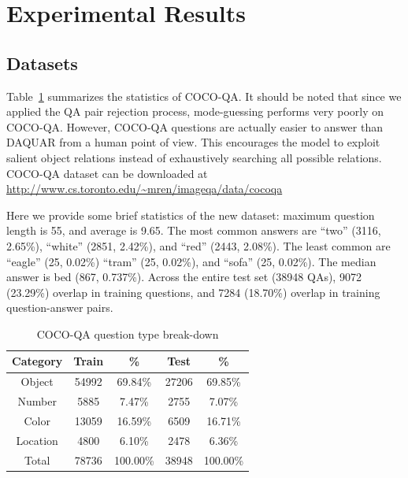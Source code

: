 \documentclass{article} %
\renewcommand{\#}[1]{\textbf{#1}}
\begin{document}
\section{Experimental Results}

\subsection{Datasets}

Table~\ref{tab:dataset_category_stats} summarizes the statistics of COCO-QA. It
should be noted that since we applied the QA pair rejection process,
mode-guessing performs very poorly on COCO-QA. However, COCO-QA questions are
actually easier to answer than DAQUAR from a human point of view. This
encourages the model to exploit salient object relations instead of
exhaustively searching all possible relations. COCO-QA dataset can be
downloaded at \url{http://www.cs.toronto.edu/~mren/imageqa/data/cocoqa}

Here we provide some brief statistics of the new dataset: maximum question
length is 55, and average is 9.65.  The most common answers are ``two'' (3116,
2.65\%), ``white'' (2851, 2.42\%), and ``red'' (2443, 2.08\%). The least common
are ``eagle'' (25, 0.02\%) ``tram'' (25, 0.02\%), and ``sofa'' (25, 0.02\%).
The median answer is bed (867, 0.737\%).  Across the entire test set (38948
QAs), 9072 (23.29\%) overlap in training questions, and 7284 (18.70\%) overlap
in training question-answer pairs.

\begin{table}
\caption{COCO-QA question type break-down}
\label{tab:dataset_category_stats}
\vskip 0.15in
\begin{center}
\begin{small}
\begin{sc}
\begin{tabular}{c c c c c}
\hline
Category & Train & \%       & Test  & \%       \\
\hline
Object   & 54992 & 69.84\%  & 27206 & 69.85\%  \\
Number   & 5885  & 7.47\%   & 2755  & 7.07\%   \\
Color    & 13059 & 16.59\%  & 6509  & 16.71\%  \\
Location & 4800  & 6.10\%   & 2478  & 6.36\%   \\
\hline
Total    & 78736 & 100.00\% & 38948 & 100.00\% \\
\hline
\end{tabular}
\end{sc}
\end{small}
\end{center}
\end{table}
\end{document}
